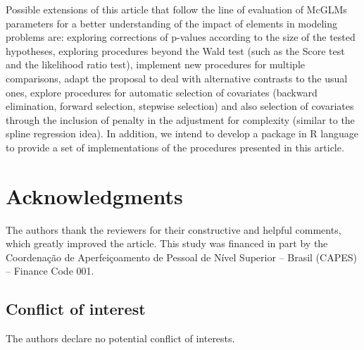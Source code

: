 \documentclass[AMA,STIX1COL]{WileyNJD-v2}
\begin{document}
Possible extensions of this article that follow the line of evaluation of McGLMs parameters for a better understanding of the impact of elements in modeling problems are: exploring corrections of p-values according to the size of the tested hypotheses, exploring procedures beyond the Wald test (such as the Score test and the likelihood ratio test), implement new procedures for multiple comparisons, adapt the proposal to deal with alternative contrasts to the usual ones, explore procedures for automatic selection of covariates (backward elimination, forward selection, stepwise selection) and also selection of covariates through the inclusion of penalty in the adjustment for complexity (similar to the spline regression idea). In addition, we intend to develop a package in R language to provide a set of implementations of the procedures presented in this article.



\section*{Acknowledgments}

The authors thank the reviewers for their constructive and helpful comments, which greatly improved the article. This study was financed in part by the Coordenação de Aperfeiçoamento de Pessoal de Nível Superior – Brasil (CAPES) – Finance Code 001.


\subsection*{Conflict of interest}

The authors declare no potential conflict of interests.



\end{document}

